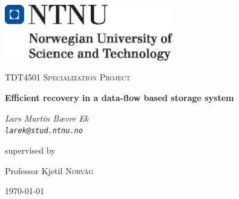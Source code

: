 \documentclass[b5paper]{report}
\begin{document}
\begin{titlepage}
  \centering
	\includegraphics[width=0.55\textwidth]{ntnu}\par\vspace{1cm}
	{\scshape\Large TDT4501 Specialization Project \par}
	\vspace{1.5cm}
	{\huge\bfseries Efficient recovery in a data-flow based storage system\par}
	\vspace{2cm}
	{\Large\itshape Lars Martin Bævre Ek \\ \texttt{larek@stud.ntnu.no} \par}
	\vfill
	supervised by\par
  Professor Kjetil \textsc{Nørvåg}

	{\large \today\par}
\end{titlepage}


\end{document}
